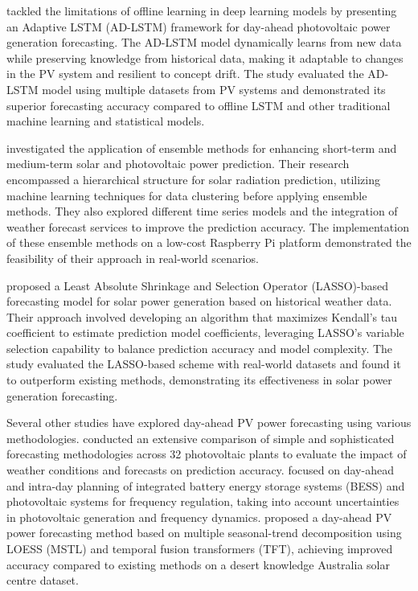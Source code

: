 \citet{Luo_2022} tackled the limitations of offline learning in deep learning models by presenting an Adaptive LSTM (AD-LSTM) framework for day-ahead photovoltaic power generation forecasting. The AD-LSTM model dynamically learns from new data while preserving knowledge from historical data, making it adaptable to changes in the PV system and resilient to concept drift. The study evaluated the AD-LSTM model using multiple datasets from PV systems and demonstrated its superior forecasting accuracy compared to offline LSTM and other traditional machine learning and statistical models.

\citet{Dao_2020} investigated the application of ensemble methods for enhancing short-term and medium-term solar and photovoltaic power prediction. Their research encompassed a hierarchical structure for solar radiation prediction, utilizing machine learning techniques for data clustering before applying ensemble methods. They also explored different time series models and the integration of weather forecast services to improve the prediction accuracy. The implementation of these ensemble methods on a low-cost Raspberry Pi platform demonstrated the feasibility of their approach in real-world scenarios.

\citet{Tang_2018} proposed a Least Absolute Shrinkage and Selection Operator (LASSO)-based forecasting model for solar power generation based on historical weather data. Their approach involved developing an algorithm that maximizes Kendall's tau coefficient to estimate prediction model coefficients, leveraging LASSO's variable selection capability to balance prediction accuracy and model complexity. The study evaluated the LASSO-based scheme with real-world datasets and found it to outperform existing methods, demonstrating its effectiveness in solar power generation forecasting.

Several other studies have explored day-ahead PV power forecasting using various methodologies. \citet{Gigoni_2018} conducted an extensive comparison of simple and sophisticated forecasting methodologies across 32 photovoltaic plants to evaluate the impact of weather conditions and forecasts on prediction accuracy. \citet{Conte_2020} focused on day-ahead and intra-day planning of integrated battery energy storage systems (BESS) and photovoltaic systems for frequency regulation, taking into account uncertainties in photovoltaic generation and frequency dynamics. \citet{jiang2023dayahead} proposed a day-ahead PV power forecasting method based on multiple seasonal-trend decomposition using LOESS (MSTL) and temporal fusion transformers (TFT), achieving improved accuracy compared to existing methods on a desert knowledge Australia solar centre dataset.

